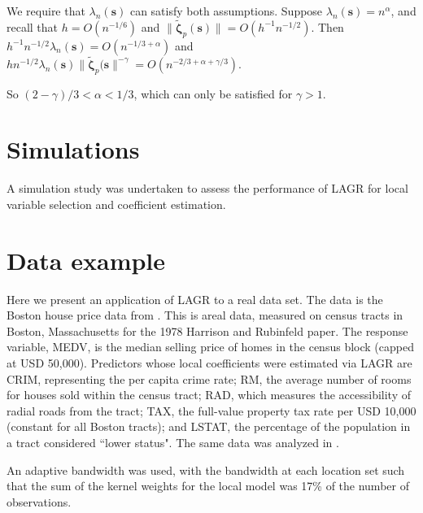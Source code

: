 \documentclass[authoryear, review, 11pt]{elsarticle}
\begin{document}
        We require that $\lambda_n(\bm{s})$ can satisfy both assumptions. Suppose $\lambda_n(\bm{s}) = n^{\alpha}$, and recall that $h = O(n^{-1/6})$ and $ \| \tilde{\bm{\zeta}}_p(\bm{s}) \| = O(h^{-1} n^{-1/2})$. Then $h^{-1} n^{-1/2} \lambda_n(\bm{s}) = O(n^{-1/3 + \alpha})$ and $h n^{-1/2} \lambda_n(\bm{s})  \| \tilde{\bm{\zeta}}_p(\bm{s} \|^{-\gamma} = O(n^{-2/3 + \alpha + \gamma/3})$.
        
        So $ (2 - \gamma)/3 < \alpha < 1/3 $, which can only be satisfied for $\gamma > 1$.

    \section{Simulations}
        A simulation study was undertaken to assess the performance of LAGR for local variable selection and coefficient estimation. 


    \section{Data example}
        Here we present an application of LAGR to a real data set. The data is the Boston house price data from \cite{Harrison-Rubinfeld-1978; Gilley-Pace-1996; Pace-Gilley-1997}. This is areal data, measured on census tracts in Boston, Massachusetts for the 1978 Harrison and Rubinfeld paper. The response variable, MEDV, is the median selling price of homes in the census block (capped at USD 50,000). Predictors whose local coefficients were estimated via LAGR are CRIM, representing the per capita crime rate; RM, the average number of rooms for houses sold within the census tract; RAD, which measures the accessibility of radial roads from the tract; TAX, the full-value property tax rate per USD 10,000 (constant for all Boston tracts); and LSTAT, the percentage of the population in a tract considered ``lower status". The same data was analyzed in \cite{Sun-Yan-Zhang-Lu-2014}.

        An adaptive bandwidth was used, with the bandwidth at each location set such that the sum of the kernel weights for the local model was 17\% of the number of observations. 

        


\appendix
\end{document}
